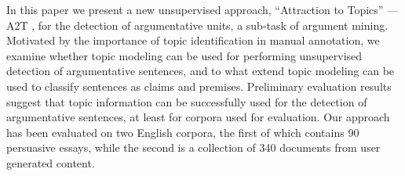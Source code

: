 In this paper we present a new unsupervised approach, ``Attraction to Topics'' --- A2T , for the detection of argumentative units, a sub-task of argument mining. Motivated by the importance of topic identification in manual annotation, we examine whether topic modeling can be used for performing unsupervised detection of argumentative sentences, and to what extend topic modeling can be used to classify sentences as claims and premises. Preliminary evaluation results suggest that topic information can be successfully used for the detection of argumentative sentences, at least for corpora used for evaluation. Our approach has been evaluated on two English corpora, the first of which contains 90 persuasive essays, while the second is a collection of 340 documents from user generated content.
